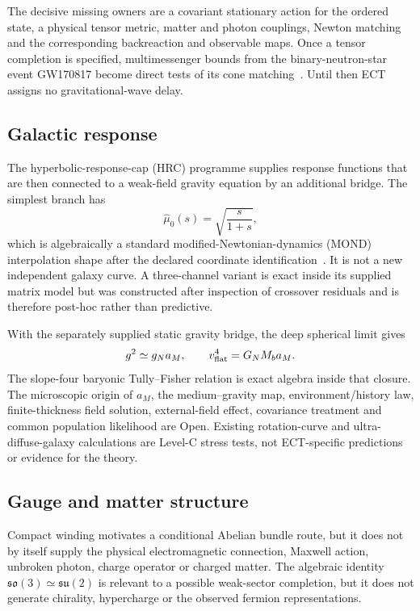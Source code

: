 \documentclass[11pt,a4paper]{article}
\begin{document}
The decisive missing owners are a covariant stationary action for the
ordered state, a physical tensor metric, matter and photon couplings, Newton
matching and the corresponding backreaction and observable maps.  Once a
tensor completion is specified, multimessenger bounds from the
binary-neutron-star event GW170817 become
direct tests of its cone matching~\cite{LIGO_Fermi_GW170817_GRB2017}.  Until
then ECT assigns no gravitational-wave delay.

\subsection{Galactic response}

The hyperbolic-response-cap (HRC) programme supplies response functions that
are then connected to a weak-field gravity equation by an additional bridge.
The simplest branch has
\begin{equation}
 \widehat\mu_0(s)=\sqrt{\frac{s}{1+s}},
 \label{eq:hrc0}
\end{equation}
which is algebraically a standard modified-Newtonian-dynamics (MOND)
interpolation shape after the
declared coordinate identification~\cite{Milgrom1983,Famaey2012}.  It is not
a new independent galaxy curve.  A three-channel variant is exact inside its
supplied matrix model but was constructed after inspection of crossover
residuals and is therefore post-hoc rather than predictive.

With the separately supplied static gravity bridge, the deep spherical limit
gives
\begin{equation}
 g^2\simeq g_Na_M,
 \qquad
 v_{\rm flat}^4=G_NM_ba_M .
 \label{eq:btfr}
\end{equation}
The slope-four baryonic Tully--Fisher relation is exact algebra inside that
closure.  The microscopic origin of $a_M$, the medium--gravity map,
environment/history law, finite-thickness field solution, external-field
effect, covariance treatment and common population likelihood are Open.
Existing rotation-curve and ultra-diffuse-galaxy calculations are Level-C
stress tests, not ECT-specific predictions or evidence for the theory.

\subsection{Gauge and matter structure}

Compact winding motivates a conditional Abelian bundle route, but it does not
by itself supply the physical electromagnetic connection, Maxwell action,
unbroken photon, charge operator or charged matter.  The algebraic identity
$\mathfrak{so}(3)\simeq\mathfrak{su}(2)$ is relevant to a possible weak-sector
completion, but it does not generate chirality, hypercharge or the observed
fermion representations.
\end{document}
